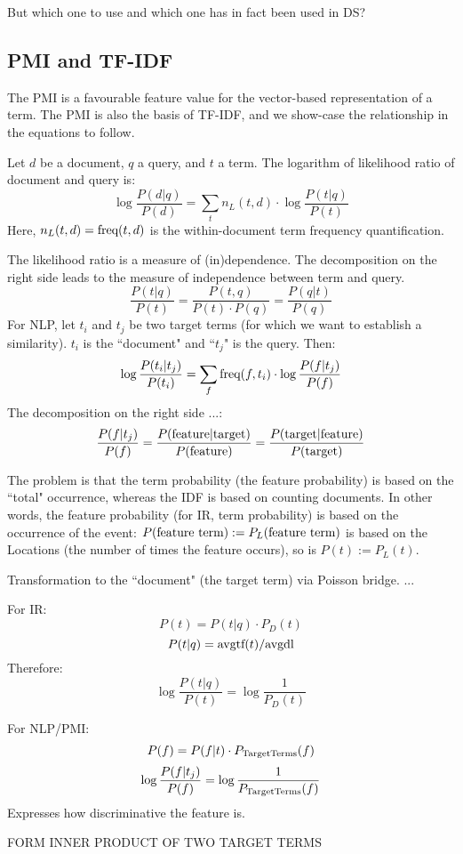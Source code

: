 But which one to use and which one has in fact been used in DS?

\subsection{PMI and TF-IDF}

The PMI is a favourable feature value for the vector-based representation
of a term.
The PMI is also the basis of TF-IDF, and we show-case the relationship
in the equations to follow.

Let $d$ be a document, $q$ a query, and $t$ a term.
The logarithm of likelihood ratio of document and query is:
\[
\log\frac{P(d|q)}{P(d)} =
	\sum_t n_L(t,d) \cdot \log\frac{P(t|q)}{P(t)}
\]
Here, $n_L(t,d)=\textmd{freq}(t,d)$ is the within-document term frequency
quantification.

The likelihood ratio is a measure of (in)dependence.
The decomposition on the right side leads to the measure of independence
between term and query.
\[
\frac{P(t|q)}{P(t)} = \frac{P(t,q)}{P(t) \cdot P(q)} = \frac{P(q|t)}{P(q)}
\]
For NLP, let $t_i$ and $t_j$ be two target terms
(for which we want to establish a similarity).
$t_i$ is the ``document" and ``$t_j$" is the query.
Then:
\[
\log\frac{P(t_i|t_j)}{P(t_i)} =
	\sum_f \textmd{freq}(f,t_i) \cdot \log\frac{P(f|t_j)}{P(f)}
\]
The decomposition on the right side ...:
\[
\frac{P(f|t_j)}{P(f)} =
\frac{P(\textmd{feature}|\textmd{target})}{P(\textmd{feature})} =
\frac{P(\textmd{target}|\textmd{feature})}{P(\textmd{target})}
\]

The problem is that the term probability (the feature probability)
is based on the ``total" occurrence, whereas the IDF is based
on counting documents.
In other words,
the feature probability (for IR, term probability) is based on
the occurrence of the event:
$P(\textmd{feature term}):=P_L(\textmd{feature term})$
is based on the Locations (the number of times the feature occurs), so is
$P(t):=P_L(t)$.

Transformation to the ``document" (the target term) via Poisson bridge.
...

For IR:
\[
P(t) = P(t|q) \cdot P_D(t)
\]
\[
P(t|q) = \textmd{avgtf}(t) / \textmd{avgdl}
\]
Therefore:
\[
\log\frac{P(t|q)}{P(t)} = \log\frac{1}{P_D(t)}
\]

For NLP/PMI:
\[
P(f) = P(f|t) \cdot P_\textmd{TargetTerms}(f)
\]
\[
\log\frac{P(f|t_j)}{P(f)} = \log\frac{1}{P_\textmd{TargetTerms}(f)}
\]
Expresses how discriminative the feature is.


FORM INNER PRODUCT OF TWO TARGET TERMS



